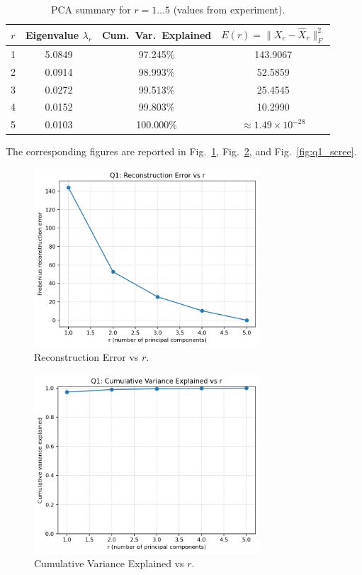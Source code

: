 \documentclass[12pt,a4paper]{article}
\begin{document}
\begin{table}[H]
\centering
\caption{PCA summary for $r=1\ldots 5$ (values from experiment).}
\begin{tabular}{@{}cccc@{}}
\toprule
$r$ & Eigenvalue $\lambda_r$ & Cum.\ Var.\ Explained & $E(r)=\|X_c-\hat X_r\|_F^2$ \\
\midrule
1 & 5.0849 & 97.245\% & 143.9067 \\
2 & 0.0914 & 98.993\% & 52.5859 \\
3 & 0.0272 & 99.513\% & 25.4545 \\
4 & 0.0152 & 99.803\% & 10.2990 \\
5 & 0.0103 & 100.000\% & $\approx 1.49\times10^{-28}$ \\
\bottomrule
\end{tabular}
\end{table}

\noindent The corresponding figures are reported in Fig.~\ref{fig:q1_err}, Fig.~\ref{fig:q1_cum}, and Fig.~\ref{fig:q1_scree}.

\begin{figure}[H]
    \centering
    \includegraphics[width=0.75\textwidth]{outputs/q1/q1_error_vs_r.png}
    \caption{Reconstruction Error vs $r$.}
    \label{fig:q1_err}
\end{figure}

\begin{figure}[H]
    \centering
    \includegraphics[width=0.75\textwidth]{outputs/q1/q1_cumvar_vs_r.png}
    \caption{Cumulative Variance Explained vs $r$.}
    \label{fig:q1_cum}
\end{figure}
\end{document}
